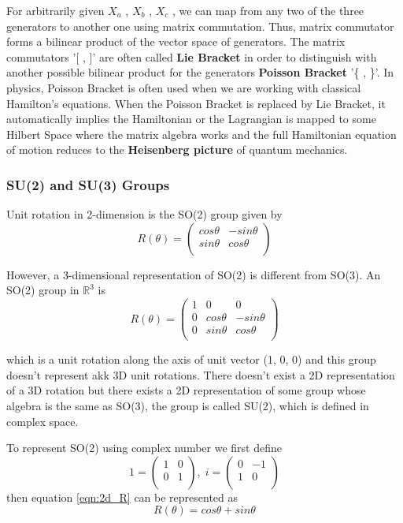 For arbitrarily given $X_a$ , $X_b$ , $X_c$ , we can map from any two of the three generators to another one using matrix commutation. 
Thus, matrix commutator forms a bilinear product of the vector space of generators. 
The matrix commutators '[ , ]' are often called \textbf{Lie Bracket} in order to distinguish with another possible bilinear product for the generators \textbf{Poisson Bracket} '\{ , \}'.
In physics, Poisson Bracket is often used when we are working with classical Hamilton's equations. 
When the Poisson Bracket is replaced by Lie Bracket, it automatically implies the Hamiltonian or the Lagrangian is mapped to some Hilbert Space where the matrix
algebra works and the full Hamiltonian equation of motion reduces to the \textbf{Heisenberg picture} of quantum mechanics.

\subsubsection{SU(2) and SU(3) Groups}
Unit rotation in 2-dimension is the SO(2) group given by
\begin{equation}
    R(\theta) = \begin{pmatrix}
        cos\theta & -sin\theta \\ 
        sin\theta & cos\theta \\ 
\end{pmatrix}
\label{eqn:2d_R}
\end{equation}

However, a 3-dimensional representation of SO(2) is different from SO(3).
An SO(2) group in $\mathbb{R}^3$ is
\begin{equation}
    R(\theta) = \begin{pmatrix}
        1 & 0 & 0 \\ 
        0 & cos\theta & -sin\theta \\ 
        0 & sin\theta & cos\theta \\ 
\end{pmatrix}
\end{equation}

which is a unit rotation along the axis of unit vector (1, 0, 0) and this group doesn't represent akk 3D unit rotations.
There doesn't exist a 2D representation of a 3D rotation but there exists a 2D representation of some group whose algebra is the same as SO(3),
the group is called SU(2), which is defined in complex space.

To represent SO(2) using complex number we first define
\begin{equation}
    1 = \begin{pmatrix}
        1 & 0 \\ 
        0 & 1 \\ 
\end{pmatrix}, \;
i = \begin{pmatrix}
    0 & -1 \\ 
    1 & 0 \\ 
\end{pmatrix}
\end{equation}
then equation \ref{eqn:2d_R} can be represented as
\begin{equation}
    R(\theta) = cos\theta + sin\theta
\end{equation}

